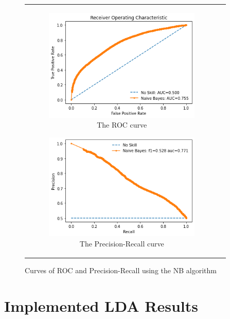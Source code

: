 \begin{figure}[H]
\begin{tabular}{@{}cc@{}}
\begin{subfigure}{0.5\textwidth}
  \centering
  \includegraphics[width=7.5cm]{fig/chapter5/NB/ROC_new.png}
  \caption{\footnotesize{The \acrshort{ROC} curve}}
  \label{fig:nbroc}
\end{subfigure} 
\begin{subfigure}{0.5\textwidth}
  \centering
  \includegraphics[width=7.5cm]{fig/chapter5/NB/Precision-Recall_new.png}
  \caption{\footnotesize{The Precision-Recall curve}}
  \label{fig:nbprerec}
\end{subfigure} \\
\end{tabular}
\caption{Curves of \acrshort{ROC} and Precision-Recall using the \acrlong{NB} algorithm}
\label{fig:nbcurves}
\end{figure}

\section{Implemented LDA Results}

